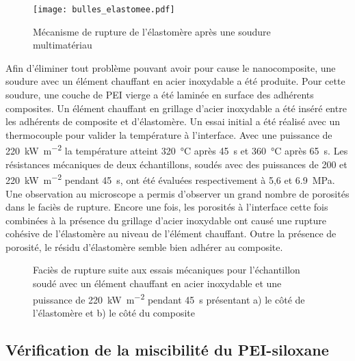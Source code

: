 \begin{figure}[h]
	\centering
	\texttt{[image: bulles\_elastomee.pdf]}
	\caption{Mécanisme de rupture de l'élastomère après une soudure multimatériau}
	\label{fig:bulles_elastomere}
\end{figure}

Afin d'éliminer tout problème pouvant avoir pour cause le nanocomposite, une soudure avec un élément chauffant en acier inoxydable a été produite. 
Pour cette soudure, une couche de PEI vierge a été laminée en surface des adhérents composites.
Un élément chauffant en grillage d'acier inoxydable a été inséré entre les adhérents de composite et d'élastomère. 
Un essai initial a été réalisé avec un thermocouple pour valider la température à l'interface. 
Avec une puissance de \SI[locale=FR]{220}{\kilo\watt\per\square\metre} la température atteint \SI[locale=FR]{320}{\celsius} après \SI[locale=FR]{45}{\second} et \SI[locale=FR]{360}{\celsius} après \SI[locale=FR]{65}{\second}. 
Les résistances mécaniques de deux échantillons, soudés avec des puissances de 200 et \SI[locale=FR]{220}{\kilo\watt\per\square\metre} pendant \SI[locale=FR]{45}{\second}, ont été évaluées respectivement à 5,6 et \SI[locale=FR]{6,9}{\mega\pascal}. 
Une observation au microscope a permis d'observer un grand nombre de porosités dans le faciès de rupture. 
Encore une fois, les porosités à l'interface cette fois combinées à la présence du grillage d'acier inoxydable ont causé une rupture cohésive de l'élastomère au niveau de l'élément chauffant. 
Outre la présence de porosité, le résidu d'élastomère semble bien adhérer au composite.  

\begin{figure}[h]
	\centering
	 \qquad
	\caption{Faciès de rupture suite aux essais mécaniques pour l'échantillon soudé avec un élément chauffant en acier inoxydable et une puissance de \SI{220}{\kilo\watt\per\square\metre} pendant \SI{45}{\second} présentant a) le côté de l'élastomère et b) le côté du composite}
	\label{fig:STM1500_facies_soudure_SS}
\end{figure}

\FloatBarrier
\subsection{Vérification de la miscibilité du PEI-siloxane}

